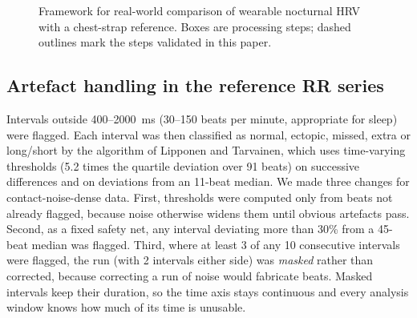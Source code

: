 \documentclass[11pt,a4paper]{article}
\begin{document}
\begin{figure}[t]
\caption{Framework for real-world comparison of wearable nocturnal HRV with a chest-strap reference. Boxes are processing steps; dashed outlines mark the steps validated in this paper.}
\label{fig:framework}
\end{figure}

\subsection{Artefact handling in the reference RR series}
Intervals outside 400--2000~ms (30--150 beats per minute, appropriate for sleep) were flagged. Each interval was then classified as normal, ectopic, missed, extra or long/short by the algorithm of Lipponen and Tarvainen, which uses time-varying thresholds (5.2 times the quartile deviation over 91 beats) on successive differences and on deviations from an 11-beat median.\autocite{lipponen2019} We made three changes for contact-noise-dense data. First, thresholds were computed only from beats not already flagged, because noise otherwise widens them until obvious artefacts pass. Second, as a fixed safety net, any interval deviating more than 30\% from a 45-beat median was flagged. Third, where at least 3 of any 10 consecutive intervals were flagged, the run (with 2 intervals either side) was \emph{masked} rather than corrected, because correcting a run of noise would fabricate beats. Masked intervals keep their duration, so the time axis stays continuous and every analysis window knows how much of its time is unusable.
\end{document}
